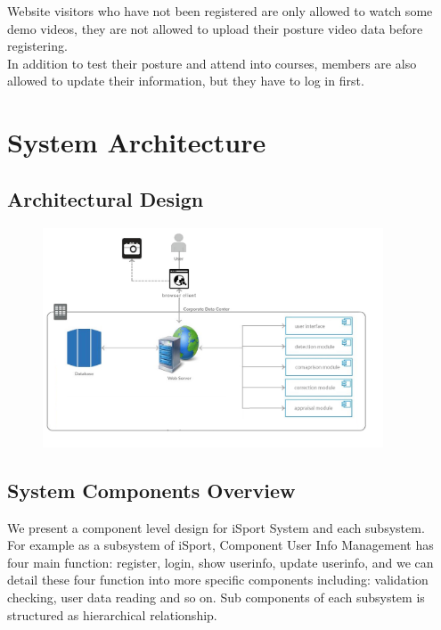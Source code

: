 \documentclass[16pt]{scrreprt}
\begin{document}
 
Website visitors who have not been registered are only allowed to watch some demo videos, they are not allowed to upload their posture video data before registering.\\

 
In addition to test their posture and attend into courses, members are also allowed to update their information, but they have to log in first.\\

\chapter{System Architecture}

\section{Architectural Design}

\begin{figure}[ht]
  \centering
  \includegraphics[page=1,width=0.9\textwidth]{diagrams/architecturediagram}
  \label{fig:SDD_1}
\end{figure}

\section{System Components Overview}
We present a component level design for iSport System and each subsystem.\\

\noindent For example as a subsystem of iSport, Component User Info Management has four main function: register, login, show userinfo, update userinfo, and we can detail these four function into more specific components including: validation checking, user data reading and so on. Sub components of each subsystem is structured as hierarchical relationship.\\
\end{document}

